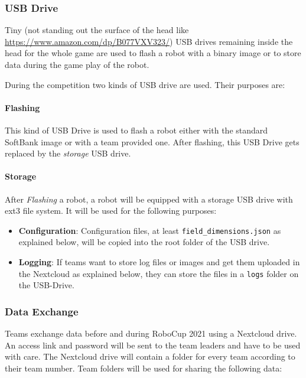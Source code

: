 \subsubsection{USB Drive}
\label{sec:c3_USB_Drive}
Tiny (not standing out the surface of the head like \url{https://www.amazon.com/dp/B077VXV323/}) USB drives remaining inside the head for the whole game are used to flash a robot with a binary image or to store data during the game play of the robot.

During the competition two kinds of USB drive are used. Their purposes are:

\paragraph*{Flashing}
This kind of USB Drive is used to flash a robot either with the standard SoftBank image or with a team provided one. After flashing, this USB Drive gets replaced by the \textit{storage} USB drive.

\paragraph*{Storage}
After \textit{Flashing} a robot, a robot will be equipped with a storage USB drive with ext3 file system. It will be used for the following purposes:

\begin{itemize}
	\item \textbf{Configuration}: Configuration files, at least \texttt{field\_dimensions.json} as explained below, will be copied into the root folder of the USB drive.
	\item  \textbf{Logging}: If teams want to store log files or images and get them uploaded in the Nextcloud as explained below, they can store the files in a \texttt{logs} folder on the USB-Drive.
\end{itemize}

\subsubsection{Data Exchange}
\label{sec:data_exchange}
Teams exchange data before and during RoboCup 2021 using a Nextcloud drive. An access link and password will be sent to the team leaders and have to be used with care. The Nextcloud drive will contain a folder for every team according to their team number. Team folders will be used for sharing the following data:

